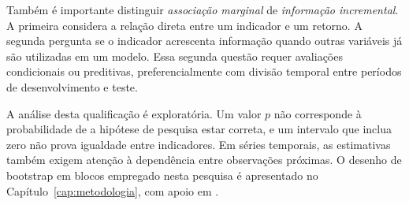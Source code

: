 Também é importante distinguir \emph{associação marginal} de \emph{informação incremental}. A primeira considera a relação direta entre um indicador e um retorno. A segunda pergunta se o indicador acrescenta informação quando outras variáveis já são utilizadas em um modelo. Essa segunda questão requer avaliações condicionais ou preditivas, preferencialmente com divisão temporal entre períodos de desenvolvimento e teste.

A análise desta qualificação é exploratória. Um valor $p$ não corresponde à probabilidade de a hipótese de pesquisa estar correta, e um intervalo que inclua zero não prova igualdade entre indicadores. Em séries temporais, as estimativas também exigem atenção à dependência entre observações próximas. O desenho de bootstrap em blocos empregado nesta pesquisa é apresentado no Capítulo~\ref{cap:metodologia}, com apoio em .
